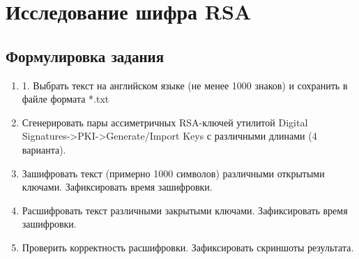 \documentclass[a4paper, 14pt]{extarticle}
\begin{document}
\section{Исследование шифра RSA}
\subsection{Формулировка задания}
\begin{enumerate}
    \item 1. Выбрать текст на английском языке (не менее 1000 знаков) и сохранить в файле формата *.txt
    \item  Сгенерировать пары ассиметричных RSA-ключей утилитой Digital Signatures->PKI->Generate/Import Keys с различными длинами (4 варианта).
    \item  Зашифровать текст (примерно 1000 символов) различными открытыми ключами. Зафиксировать время зашифровки.
    \item  Расшифровать текст различными закрытыми ключами. Зафиксировать время зашифровки.
    \item  Проверить корректность расшифровки. Зафиксировать скриншоты результата.
\end{enumerate}
\end{document}
